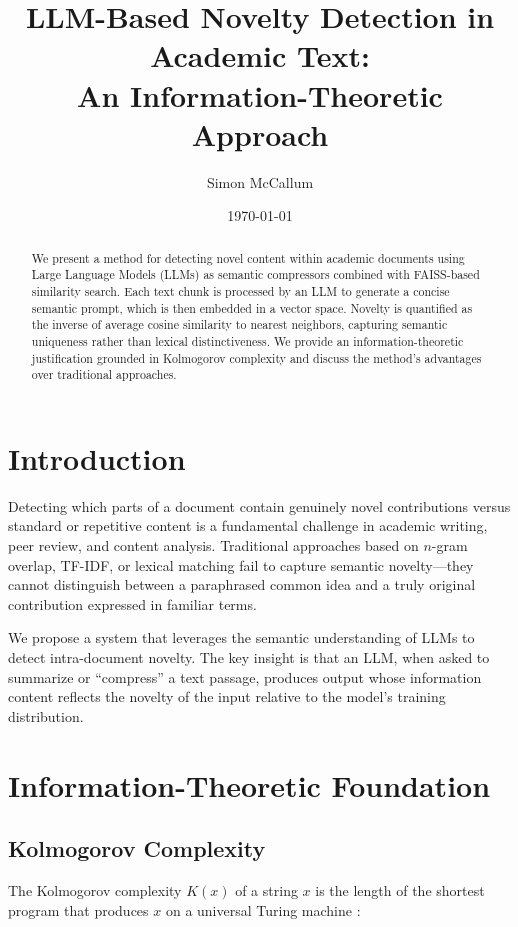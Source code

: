 \documentclass[11pt,a4paper]{article}
\title{LLM-Based Novelty Detection in Academic Text:\\An Information-Theoretic Approach}
\author{Simon McCallum}
\date{\today}
\begin{document}
\maketitle

\begin{abstract}
We present a method for detecting novel content within academic documents using
Large Language Models (LLMs) as semantic compressors combined with FAISS-based
similarity search. Each text chunk is processed by an LLM to generate a concise
semantic prompt, which is then embedded in a vector space. Novelty is quantified
as the inverse of average cosine similarity to nearest neighbors, capturing
semantic uniqueness rather than lexical distinctiveness. We provide an
information-theoretic justification grounded in Kolmogorov complexity and discuss
the method's advantages over traditional approaches.
\end{abstract}

\section{Introduction}

Detecting which parts of a document contain genuinely novel contributions versus
standard or repetitive content is a fundamental challenge in academic writing,
peer review, and content analysis. Traditional approaches based on $n$-gram
overlap, TF-IDF, or lexical matching fail to capture semantic novelty---they
cannot distinguish between a paraphrased common idea and a truly original
contribution expressed in familiar terms.

We propose a system that leverages the semantic understanding of LLMs to detect
intra-document novelty. The key insight is that an LLM, when asked to summarize
or ``compress'' a text passage, produces output whose information content
reflects the novelty of the input relative to the model's training
distribution.

\section{Information-Theoretic Foundation}

\subsection{Kolmogorov Complexity}

The Kolmogorov complexity $K(x)$ of a string $x$ is the length of the shortest
program that produces $x$ on a universal Turing machine
\citep{li2008introduction}:
\end{document}
